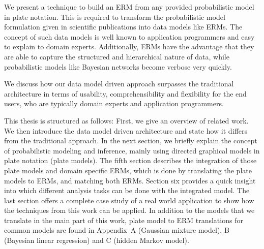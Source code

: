 We present a technique to build an ERM from any provided probabilistic model in plate notation. This is required to transform the probabilistic model formulation given in scientific publications into data models like ERMs. The concept of such data models is well known to application programmers and easy to explain to domain experts. Additionally, ERMs have the advantage that they are able to capture the structured and hierarchical nature of data, while probabilistic models like Bayesian networks become verbose very quickly.

We discuss how our data model driven approach surpasses the traditional architecture in terms of usability, comprehensibility and flexibility for the end users, who are typically domain experts and application programmers.

This thesis is structured as follows: First, we give an overview of related work. We then introduce the data model driven architecture and state how it differs from the traditional approach. In the next section, we briefly explain the concept of probabilistic modeling and inference, mainly using directed graphical models in plate notation (plate models). The fifth section describes the integration of those plate models and domain specific ERMs, which is done by translating the plate models to ERMs, and matching both ERMs. Section six provides a quick insight into which different analysis tasks can be done with the integrated model. The last section offers a complete case study of a real world application to show how the techniques from this work can be applied. In addition to the models that we translate in the main part of this work, plate model to ERM translations for common models are found in Appendix~A (Gaussian mixture model), B (Bayesian linear regression) and C (hidden Markov model).
